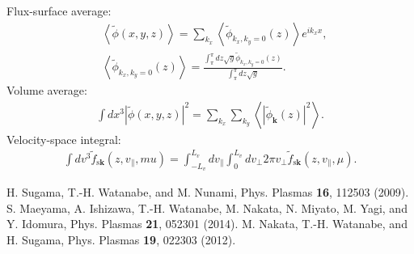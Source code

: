 Flux-surface average:
\begin{align}
  &\left\langle \tilde{\phi} (x,y,z) \right\rangle = \sum_{k_x} \left\langle \tilde{\phi}_{k_x,k_y=0}(z) \right\rangle e^{ik_xx}, \\
  &\left\langle \tilde{\phi}_{k_x,k_y=0}(z) \right\rangle = \frac{\int_\pi^\pi dz \sqrt{g} \tilde{\phi}_{k_x,k_y=0}(z)}{\int_\pi^\pi dz \sqrt{g}}.
\end{align}
Volume average:
\begin{align}
  \int dx^3 \left|\tilde{\phi}(x,y,z)\right|^2 = \sum_{k_x} \sum_{k_y} \left\langle \left| \tilde{\phi}_{\bm{k}} (z) \right|^2 \right\rangle.
\end{align}
Velocity-space integral:
\begin{align}
  \int dv^3 \tilde{f}_{\mathrm{s}\bm{k}}(z,v_\parallel,mu) = \int_{-L_v}^{L_v}dv_\parallel \int_0^{L_v} dv_\perp 2\pi v_\perp \tilde{f}_{\mathrm{s}\bm{k}}(z,v_\parallel,\mu).
\end{align}





\begin{thebibliography}{99}
  H. Sugama, T.-H. Watanabe, and M. Nunami,
  Phys. Plasmas {\bf 16}, 112503 (2009).
  S. Maeyama, A. Ishizawa, T.-H. Watanabe, M. Nakata, N. Miyato, M. Yagi, and Y. Idomura,
  Phys. Plasmas {\bf 21}, 052301 (2014).
  M. Nakata, T.-H. Watanabe, and H. Sugama,
  Phys. Plasmas {\bf 19}, 022303 (2012).
\end{thebibliography}
